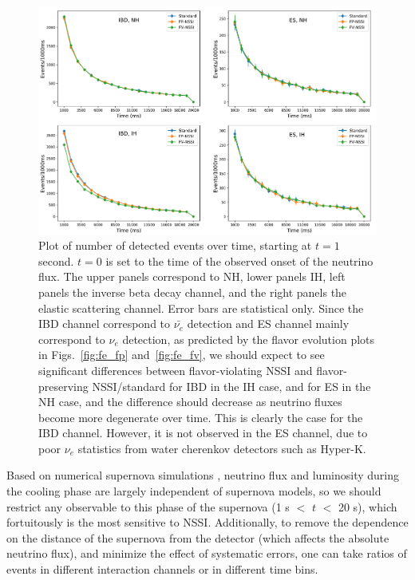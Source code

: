 \documentclass[a4paper,12pt]{article}
\begin{document}
\begin{figure}[t]
\begin{center}
\includegraphics[width=14cm]{detector_data.png}
\caption{Plot of number of detected events over time, starting at $t = 1$ second. $t = 0$ is set to the time of the observed onset of the neutrino flux. The upper panels correspond to NH, lower panels IH, left panels the inverse beta decay channel, and the right panels the elastic scattering channel. Error bars are statistical only. Since the IBD channel correspond to $\bar{\nu_{e}}$ detection and ES channel mainly correspond to $\nu_{e}$ detection, as predicted by the flavor evolution plots in Figs.~\ref{fig:fe_fp} and~\ref{fig:fe_fv}, we should expect to see significant differences between flavor-violating NSSI and flavor-preserving NSSI/standard for IBD in the IH case, and for ES in the NH case, and the difference should decrease as neutrino fluxes become more degenerate over time. This is clearly the case for the IBD channel. However, it is not observed in the ES channel, due to poor $\nu_{e}$ statistics from water cherenkov detectors such as Hyper-K.}
\label{fig:detector_data}
\end{center}
\end{figure}

Based on numerical supernova simulations \cite{Nakazato:2012qf}, neutrino flux and luminosity during the cooling phase are largely independent of supernova models, so we should restrict any observable to this phase of the supernova (1 s $<$ $t$ $<$ 20 s), which fortuitously is the most sensitive to NSSI. Additionally, to remove the dependence on the distance of the supernova from the detector (which affects the absolute neutrino flux), and minimize the effect of systematic errors, one can take ratios of events in different interaction channels or in different time bins. 
\end{document}

